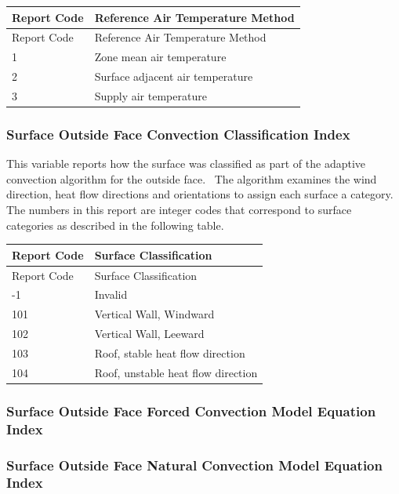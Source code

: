 \begin{longtable}[c]{@{}ll@{}}
\toprule
Report Code & Reference Air Temperature Method \tabularnewline
\midrule
\endfirsthead

\toprule
Report Code & Reference Air Temperature Method \tabularnewline
\midrule
\endhead

1 & Zone mean air temperature \tabularnewline
2 & Surface adjacent air temperature \tabularnewline
3 & Supply air temperature \tabularnewline
\bottomrule
\end{longtable}

\subsubsection{Surface Outside Face Convection Classification Index}\label{surface-outside-face-convection-classification-index}

This variable reports how the surface was classified as part of the adaptive convection algorithm for the outside face.~ The algorithm examines the wind direction, heat flow directions and orientations to assign each surface a category.~ The numbers in this report are integer codes that correspond to surface categories as described in the following table.

\begin{longtable}[c]{@{}ll@{}}
\toprule
Report Code & Surface Classification \tabularnewline
\midrule
\endfirsthead

\toprule
Report Code & Surface Classification \tabularnewline
\midrule
\endhead
-1 & Invalid \tabularnewline
101 & Vertical Wall, Windward \tabularnewline
102 & Vertical Wall, Leeward \tabularnewline
103 & Roof, stable heat flow direction \tabularnewline
104 & Roof, unstable heat flow direction \tabularnewline
\bottomrule
\end{longtable}

\subsubsection{Surface Outside Face Forced Convection Model Equation Index}\label{surface-outside-face-forced-convection-model-equation-index}

\subsubsection{Surface Outside Face Natural Convection Model Equation Index}\label{surface-outside-face-natural-convection-model-equation-index}


